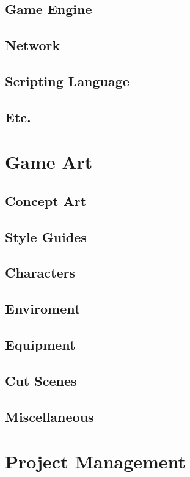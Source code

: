 \documentclass[article, 11pt]{article}
\begin{document}
\subsection{Game Engine}
\label{sec:org28adf12}
\subsection{Network}
\label{sec:orgb8fb21f}
\subsection{Scripting Language}
\label{sec:org0220519}
\subsection{Etc.}
\label{sec:orgb16d09d}

\section{Game Art}
\label{sec:org32cb3d3}
\subsection{Concept Art}
\label{sec:org7491a6f}
\subsection{Style Guides}
\label{sec:orgf31bfb1}
\subsection{Characters}
\label{sec:orgf531b6f}
\subsection{Enviroment}
\label{sec:org7736a76}
\subsection{Equipment}
\label{sec:org7fe7247}
\subsection{Cut Scenes}
\label{sec:org1399539}
\subsection{Miscellaneous}
\label{sec:org1410570}

\section{Project Management}
\label{sec:org05f1edb}
\end{document}
